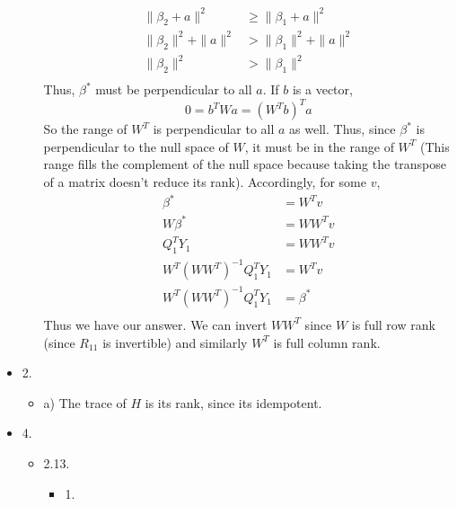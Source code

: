 \documentclass[11pt]{article}
\theoremstyle{definition}
\begin{document}
\begin{itemize}
\begin{itemize}
\begin{align*}
                    \|\beta_2+a\|^2 &\geq \|\beta_1 + a\|^2 \\
                    \|\beta_2\|^2 + \|a\|^2 &> \|\beta_1\|^2 + \|a\|^2 \\
                    \|\beta_2\|^2 &> \|\beta_1\|^2 \\
                \end{align*}
                Thus, $\beta^*$ must be perpendicular to all $a$. If $b$ is a vector, 
                \[0= b^T W a = (W^Tb)^T a \]
                So the range of \(W^T\) is perpendicular to all $a$ as well. Thus, since $\beta^*$ is perpendicular to the null space of \(W\), it must be in the range of \(W^T\) (This range fills the complement of the null space because taking the transpose of a matrix doesn't reduce its rank). Accordingly, for some $v$,
                \begin{align*}
                    \beta^* &= W^Tv \\
                    W\beta^* &= WW^Tv \\
                    Q_1^T Y_1 &= WW^Tv  \\
                    W^T(WW^T)^{-1} Q_1^T Y_1 &= W^T v \\
                    W^T(WW^T)^{-1} Q_1^T Y_1 &= \beta^*  \\
                \end{align*}
                Thus we have our answer. We can invert \(WW^T\) since \(W\) is full row rank (since \(R_{11}\) is invertible) and similarly \(W^T\) is full column rank.
        \end{itemize}
        
    \item{2.}
        \begin{itemize}
            \item{a)}
                The trace of $H$ is its rank, since its idempotent. 
        \end{itemize}
    \item{4.}
        \begin{itemize}
            \item{2.13.}
                \begin{itemize}
                    \item{1.}
                        
                \end{itemize}
        \end{itemize}

\end{itemize}
\end{document}
